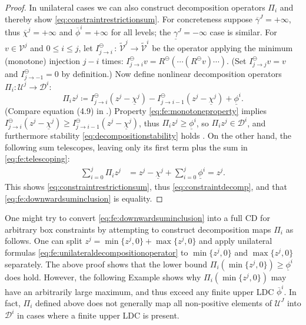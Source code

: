 \documentclass[review,hidelinks,onefignum,onetabnum,final]{siamart220329}  %
\newcommand{\cV}{\mathcal{V}}
\newcommand{\minR}{R^{\bm{\ominus}}}
\begin{document}
\begin{proof}
In unilateral cases we can also construct decomposition operators $\Pi_i$ and thereby show \eqref{eq:constraintrestrictionsum}.  For concreteness suppose $\overline{\gamma}^J=+\infty$, thus $\overline{\chi}^j=+\infty$ and $\overline{\phi}^i = +\infty$ for all levels; the $\underline{\gamma}^J=-\infty$ case is similar.  For $v\in \mathcal{V}^j$ and $0\le i \le j$, let $I_{j\to i}^\ominus\,:\,\tilde{\cV}^j \to \tilde{\cV}^i$ be the operator applying the minimum (monotone) injection $j-i$ times: $I_{j\to i}^\ominus v = \minR(\cdots(\minR v)\cdots) $.  (Set $I_{j\to j}^\ominus v = v$ and $I_{j\to -1}^\ominus=0$ by definition.)  Now define nonlinear decomposition operators $\Pi_i:\mathcal{U}^j \to \mathcal{D}^i$:
\begin{equation}
\Pi_i z^j \coloneqq I_{j\to i}^\ominus(z^j - \underline{\chi}^j) - I_{j\to i-1}^\ominus(z^j - \underline{\chi}^j) + \underline{\phi}^i.  \label{eq:fe:unilateraldecompositionoperator}
\end{equation}
(Compare equation (4.9) in \cite{GraeserKornhuber2009}.)  Property \eqref{eq:fe:monotoneproperty} implies $I_{j\to i}^\ominus(z^j - \underline{\chi}^j) \ge I_{j\to i-1}^\ominus(z^j - \underline{\chi}^j)$, thus $\Pi_i z^j \ge \underline{\phi}^i$, so $\Pi_i z^j \in \mathcal{D}^i$, and furthermore stability \eqref{eq:decompositionstability} holds \cite[Theorem 4.2]{GraeserKornhuber2009}.  On the other hand, the following sum telescopes, leaving only its first term plus the sum in \eqref{eq:fe:telescoping}:
\begin{align*}
\sum_{i=0}^j \Pi_i z^j &= z^j - \underline{\chi}^j + \sum_{i=0}^j \underline{\phi}^i = z^j.
\end{align*}
This shows \eqref{eq:constraintrestrictionsum}, thus \eqref{eq:constraintdecomp}, and that \eqref{eq:fe:downwardsuminclusion} is equality.
\end{proof}

One might try to convert \eqref{eq:fe:downwardsuminclusion} into a full CD for arbitrary box constraints by attempting to construct decomposition maps $\Pi_i$ as follows.  One can split $z^j = \min\{z^j,0\} + \max\{z^j,0\}$ and apply unilateral formulas \eqref{eq:fe:unilateraldecompositionoperator} to $\min\{z^j,0\}$ and $\max\{z^j,0\}$ separately.  The above proof shows that the lower bound $\Pi_i (\min\{z^j,0\}) \ge \underline{\phi}^i$ does hold.  However, the following Example shows why $\Pi_i(\min\{z^j,0\})$ may have an arbitrarily large maximum, and thus exceed any finite upper LDC $\overline{\phi}^i$.  In fact, $\Pi_i$ defined above does not generally map all non-positive elements of $\mathcal{U}^J$ into $\mathcal{D}^i$ in cases where a finite upper LDC is present.
\end{document}
